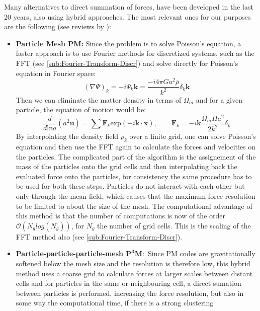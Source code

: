 Many alternatives to direct summation of forces, have been developed
in the last 20 years, also using hybrid approaches. The most relevant
ones for our purposes are the following (see reviews by \citet{trenti_gravitational_2008,dehnen_n-body_2011,kuhlen_numerical_2012}):
\begin{itemize}
\item \textbf{Particle Mesh PM: }Since the problem is to solve Poisson's
equation, a faster approach is to use Fourier methods for discretized
systems, such as the FFT (see \ref{sub:Fourier-Transform-Discr})
 and solve directly for Poisson's equation in Fourier space: 
\begin{equation}
(\nabla\Psi)_{k}=-i\Psi_{k}\mathbf{k}=\frac{-i4\pi Ga^{2}\overline{\rho}}{k^{2}}\delta_{k}\mathbf{k}
\end{equation}
Then we can eliminate the matter density in terms of $\Omega_{m}$
and for a given particle, the equation of motion would be: 
\begin{equation}
\frac{d}{d\mbox{ln}a}(a^{2}\mathbf{u})=\sum\mathbf{F}_{k}\mbox{exp}(-i\mathbf{k}\cdot\mathbf{x}),\qquad\mathbf{F}_{k}=-i\mathbf{k}\frac{\Omega_{m}Ha^{2}}{2k^{2}}\delta_{k}
\end{equation}
By interpolating the density field $\rho_{k}$ over a finite grid,
one can solve Poisson's equation and then use the FFT again to calculate
the forces and velocities on the particles. The complicated part of
the algorithm is the assignement of the mass of the particles onto
the grid cells and then interpolating back the evaluated force onto
the particles, for consistency the same procedure has to be used for
both these steps. Particles do not interact with each other but only
through the mean field, which causes that the maximum force resolution
to be limited to about the size of the mesh. The computational advantage
of this method is that the number of computations is now of the order
$\mathcal{O}(N_{g}log(N_{g}))$, for $N_{g}$ the number of grid cells.
This is the scaling of the FFT method also (see \ref{sub:Fourier-Transform-Discr}).
\item \textbf{Particle-particle-particle-mesh $\mathbf{P^{3}M}:$ }Since
PM codes are gravitationally softened below the mesh size and the
resolution is therefore low, this hybrid method uses a coarse grid
to calculate forces at larger scales between distant cells and for
particles in the same or neighbouring cell, a direct sumation between
particles is performed, increasing the force resolution, but also
in some way the computational time, if there is a strong clustering

\end{itemize}
